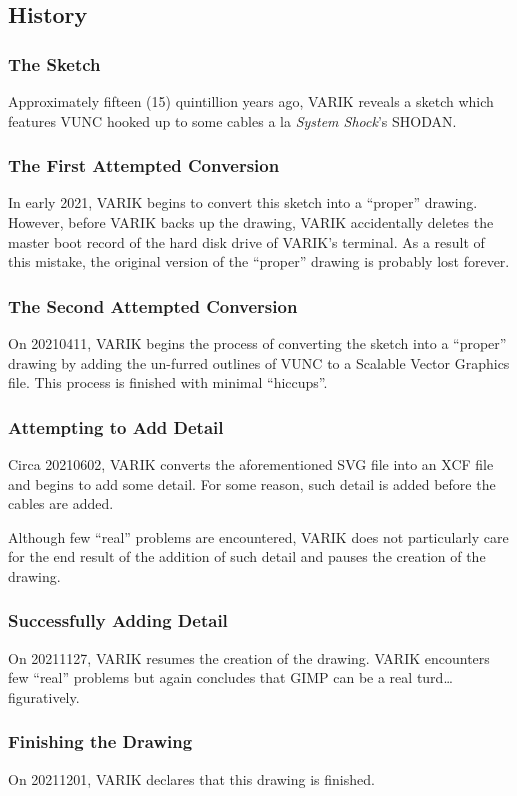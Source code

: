 \documentclass{report}
\begin{document}
\subsection{History}
\subsubsection{The Sketch}
Approximately fifteen (15) quintillion years ago, VARIK reveals a sketch which features VUNC hooked up to some cables a la \textit{System Shock}'s SHODAN\@.
\subsubsection{The First Attempted Conversion}
In early 2021, VARIK begins to convert this sketch into a ``proper'' drawing.  However, before VARIK backs up the drawing, VARIK accidentally deletes the master boot record of the hard disk drive of VARIK's terminal.  As a result of this mistake, the original version of the ``proper'' drawing is probably lost forever.
\subsubsection{The Second Attempted Conversion}
On 20210411, VARIK begins the process of converting the sketch into a ``proper'' drawing by adding the un-furred outlines of VUNC to a Scalable Vector Graphics file.  This process is finished with minimal ``hiccups''.
\subsubsection{Attempting to Add Detail}
Circa 20210602, VARIK converts the aforementioned SVG file into an XCF file and begins to add some detail.  For some reason, such detail is added before the cables are added.

Although few ``real'' problems are encountered, VARIK does not particularly care for the end result of the addition of such detail and pauses the creation of the drawing.
\subsubsection{Successfully Adding Detail}
On 20211127, VARIK resumes the creation of the drawing.  VARIK encounters few ``real'' problems but again concludes that GIMP can be a real turd\ldots figuratively.
\subsubsection{Finishing the Drawing}
On 20211201, VARIK declares that this drawing is finished.
\end{document}
